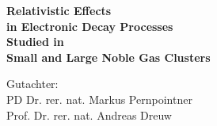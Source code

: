\thispagestyle{empty}

\vspace*{2cm}

\begin{center}
 \Large
 \textbf{Relativistic Effects\\[1ex] in Electronic Decay Processes\\[1ex]
         Studied in\\[1ex]
         Small and Large Noble Gas Clusters}


\vfill
\end{center}

\large
Gutachter:\\[2ex]
PD Dr. rer. nat. Markus Pernpointner\\
Prof. Dr. rer. nat. Andreas Dreuw

\normalsize
\cleardoublepage
